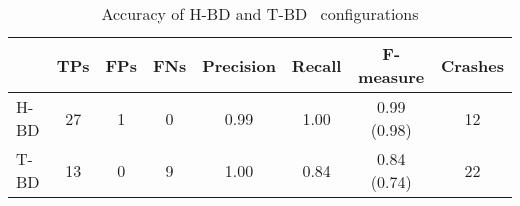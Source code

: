 \begin{table}
\begin{small}
\begin{center}
\begin{tabular}{|l||c|c|c|c|c|c|c|}
\hline
      & TPs & FPs & FNs & Precision & Recall & F-measure & Crashes \\
\hline
\hline
 H-BD  & 27  & 1    & 0   &  0.99 & 1.00 & 0.99 (0.98) & 12 \\
\hline
 T-BD & 13    &  0   &   9      & 1.00 & 0.84 & 0.84 (0.74) & 22 \\
 \hline
\end{tabular}
 \end{center}
 \caption{\label{Ta:realworldAccuracy}Accuracy of H-BD and T-BD \Tool\ configurations}
\end{small}
\end{table}


